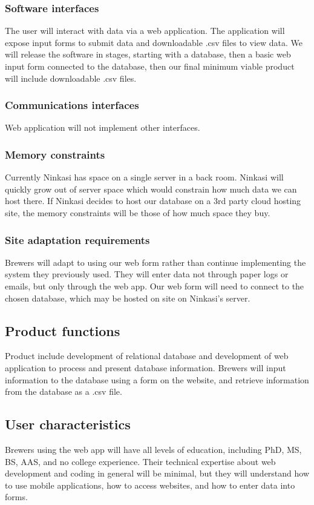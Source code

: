 \documentclass[draftclsnofoot,onecolumn,letterpaper,10pt,compsoc]{IEEEtran}
\begin{document}
		\subsubsection{Software interfaces}
        The user will interact with data via a web application. The application will expose input forms to submit data and downloadable .csv files to view data. We will release the software in stages, starting with a database, then a basic web input form connected to the database, then our final minimum viable product will include downloadable .csv files. 
        
		\subsubsection{Communications interfaces}
        Web application will not implement other interfaces.
        
		\subsubsection{Memory constraints}
        Currently Ninkasi has space on a single server in a back room. Ninkasi will quickly grow out of server space which would constrain how much data we can host there. If Ninkasi decides to host our database on a 3rd party cloud hosting site, the memory constraints will be those of how much space they buy.
        
		\subsubsection{Site adaptation requirements}
        Brewers will adapt to using our web form rather than continue implementing the system they previously used. They will enter data not through paper logs or emails, but only through the web app. Our web form will need to connect to the chosen database, which may be hosted on site on Ninkasi’s server.
        
	\subsection{Product functions}
    Product include development of relational database and development of web application to process and present database information. Brewers will input information to the database using a form on the website, and retrieve information from the database as a .csv file.
    
	\subsection{User characteristics}
    Brewers using the web app will have all levels of education, including PhD, MS, BS, AAS, and no college experience. Their technical expertise about web development and coding in general will be minimal, but they will understand how to use mobile applications, how to access websites, and how to enter data into forms.
    
\end{document}
